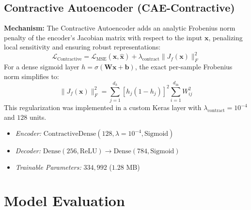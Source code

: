 \documentclass[12pt, a4paper]{article}
\begin{document}
\subsection{Contractive Autoencoder (CAE-Contractive)}
\textbf{Mechanism:} The Contractive Autoencoder adds an analytic Frobenius norm penalty of the encoder's Jacobian matrix with respect to the input $\mathbf{x}$, penalizing local sensitivity and ensuring robust representations:
\begin{equation}
    \mathcal{L}_{\text{Contractive}} = \mathcal{L}_{\text{MSE}}(\mathbf{x}, \hat{\mathbf{x}}) + \lambda_{\text{contract}} \|J_f(\mathbf{x})\|_F^2
\end{equation}
For a dense sigmoid layer $h = \sigma(\mathbf{W}\mathbf{x} + \mathbf{b})$, the exact per-sample Frobenius norm simplifies to:
\begin{equation}
    \|J_f(\mathbf{x})\|_F^2 = \sum_{j=1}^{d_h} \left[ h_j (1 - h_j) \right]^2 \sum_{i=1}^{d_{\text{in}}} W_{ij}^2
\end{equation}
This regularization was implemented in a custom Keras layer with $\lambda_{\text{contract}} = 10^{-4}$ and $128$ units.
\begin{itemize}[noitemsep]
    \item \textit{Encoder:} $\text{ContractiveDense}(128, \lambda=10^{-4}, \text{Sigmoid})$
    \item \textit{Decoder:} $\text{Dense}(256, \text{ReLU}) \to \text{Dense}(784, \text{Sigmoid})$
    \item \textit{Trainable Parameters:} $334,992$ ($1.28$ MB)
\end{itemize}


\section{Model Evaluation}
\end{document}
